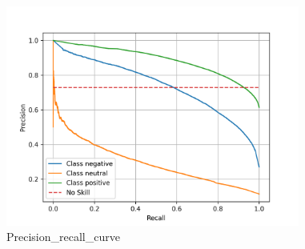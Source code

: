 \documentclass{article}%
\begin{document}
{%
\newpage%
\raggedright%


\begin{figure}[h!]%
\centering%
\includegraphics[width=365px]{./report/Learning/SGD_Classifier/Recall-Precision.png}%
\caption{Precision\_recall\_curve}%
\end{figure}

%
}%
\pagestyle{firstpage}%
\newpage%
\end{document}

